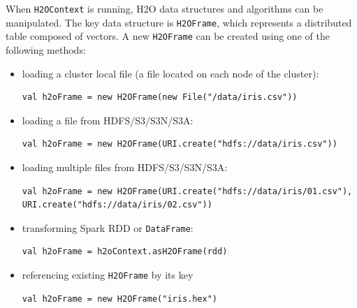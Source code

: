 \documentclass{standalone}
\begin{document}
When \texttt{H2OContext} is running, H2O data structures and algorithms can be manipulated. The key data structure is \texttt{H2OFrame}, which represents a distributed table composed of vectors. A new \texttt{H2OFrame} can be created using one of the following methods:
\begin{itemize}
	\item loading a cluster local file (a file located on each node of the cluster):
\begin{lstlisting}[style=Scala]
val h2oFrame = new H2OFrame(new File("/data/iris.csv"))
\end{lstlisting}
	\item loading a file from HDFS/S3/S3N/S3A:
\begin{lstlisting}[style=Scala]
val h2oFrame = new H2OFrame(URI.create("hdfs://data/iris.csv"))
\end{lstlisting}
	\item loading multiple files from HDFS/S3/S3N/S3A:
\begin{lstlisting}[style=Scala]
val h2oFrame = new H2OFrame(URI.create("hdfs://data/iris/01.csv"), URI.create("hdfs://data/iris/02.csv"))
\end{lstlisting}
	\item transforming Spark RDD or \texttt{DataFrame}:
\begin{lstlisting}[style=Scala]
val h2oFrame = h2oContext.asH2OFrame(rdd)
\end{lstlisting}
	\item referencing existing \texttt{H2OFrame} by its key
\begin{lstlisting}[style=Scala]
val h2oFrame = new H2OFrame("iris.hex")
\end{lstlisting}		
\end{itemize}
\end{document}
